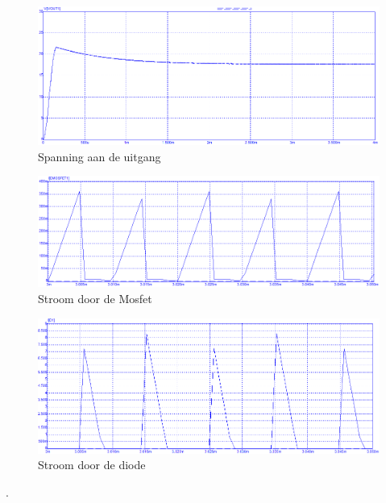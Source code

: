 \documentclass[11pt,a4paper]{article}
\begin{document}
\begin{figure}[h!]
  \centering
  \includegraphics[width = 13.5cm]{Vout 12V.png}
  \caption{Spanning aan de uitgang}
\end{figure}

\begin{figure}[h!]
  \centering
  \includegraphics[width = 13.5cm]{Ids 12V.png}
  \caption{Stroom door de Mosfet}
\end{figure}

\begin{figure}[h!]
  \centering
  \includegraphics[width = 13.5cm]{Id 12V.png}
  \caption{Stroom door de diode}
\end{figure}




.
\end{document}
